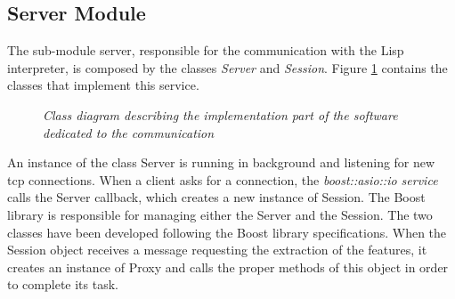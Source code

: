 		
		\subsection{Server Module}
		The sub-module server, responsible for the communication with the \mbox{Lisp} interpreter, is composed by the classes \emph{Server} and \emph{Session}. 
		Figure \ref{fig:impl_feat_extraction} contains the classes that implement this service.

		\begin{figure}[h]
		  \begin{center} 
		  \end{center} 
		  \caption{\textit{Class diagram describing the implementation part of the software dedicated to the communication}}  
		  \label{fig:impl_feat_extraction}
	 	\end{figure}	

		An instance of the class Server is running in background and listening for new tcp connections. 
		When a client asks for a connection, the \emph{boost::asio::io service} calls the Server callback, which creates a new instance of Session.
		The Boost library is responsible for managing either the Server and the Session.
		The two classes have been developed following the Boost library specifications.
		When the Session object receives a message requesting the extraction of the features, it creates an instance of Proxy and calls the proper methods of this object in order to complete its task.

		\newpage


